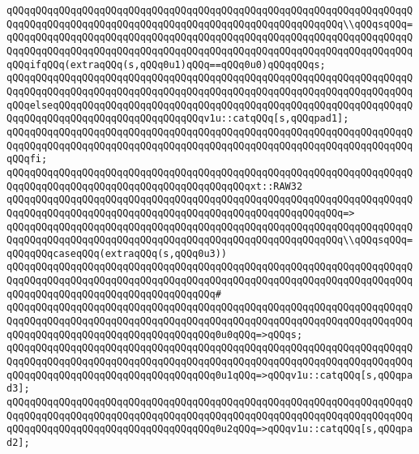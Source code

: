 \verb|qQQqqQQqqQQqqQQqqQQqqQQqqQQqqQQqqQQqqQQqqQQqqQQqqQQqqQQqqQQqqQQqqQQqqQQqqQQqqQQqqQQqqQQqqQQqqQQqqQQqqQQqqQQqqQQqqQQqqQQqqQQqqQQq\\qQQqsqQQq=|\newline
\verb|qQQqqQQqqQQqqQQqqQQqqQQqqQQqqQQqqQQqqQQqqQQqqQQqqQQqqQQqqQQqqQQqqQQqqQQqqQQqqQQqqQQqqQQqqQQqqQQqqQQqqQQqqQQqqQQqqQQqqQQqqQQqqQQqqQQqqQQqqQQqqQQqifqQQq(extraqQQq(s,qQQq0u1)qQQq==qQQq0u0)qQQqqQQqs;|\newline
\verb|qQQqqQQqqQQqqQQqqQQqqQQqqQQqqQQqqQQqqQQqqQQqqQQqqQQqqQQqqQQqqQQqqQQqqQQqqQQqqQQqqQQqqQQqqQQqqQQqqQQqqQQqqQQqqQQqqQQqqQQqqQQqqQQqqQQqqQQqqQQqqQQqelseqQQqqQQqqQQqqQQqqQQqqQQqqQQqqQQqqQQqqQQqqQQqqQQqqQQqqQQqqQQqqQQqqQQqqQQqqQQqqQQqqQQqqQQqqQQqqQQqv1u::catqQQq[s,qQQqpad1];|\newline
\verb|qQQqqQQqqQQqqQQqqQQqqQQqqQQqqQQqqQQqqQQqqQQqqQQqqQQqqQQqqQQqqQQqqQQqqQQqqQQqqQQqqQQqqQQqqQQqqQQqqQQqqQQqqQQqqQQqqQQqqQQqqQQqqQQqqQQqqQQqqQQqqQQqfi;|\newline
\newline
\verb|qQQqqQQqqQQqqQQqqQQqqQQqqQQqqQQqqQQqqQQqqQQqqQQqqQQqqQQqqQQqqQQqqQQqqQQqqQQqqQQqqQQqqQQqqQQqqQQqqQQqqQQqqQQqqQQqxt::RAW32|\newline
\verb|qQQqqQQqqQQqqQQqqQQqqQQqqQQqqQQqqQQqqQQqqQQqqQQqqQQqqQQqqQQqqQQqqQQqqQQqqQQqqQQqqQQqqQQqqQQqqQQqqQQqqQQqqQQqqQQqqQQqqQQqqQQqqQQq=>|\newline
\verb|qQQqqQQqqQQqqQQqqQQqqQQqqQQqqQQqqQQqqQQqqQQqqQQqqQQqqQQqqQQqqQQqqQQqqQQqqQQqqQQqqQQqqQQqqQQqqQQqqQQqqQQqqQQqqQQqqQQqqQQqqQQqqQQq\\qQQqsqQQq=qQQqqQQqcaseqQQq(extraqQQq(s,qQQq0u3))|\newline
\verb|qQQqqQQqqQQqqQQqqQQqqQQqqQQqqQQqqQQqqQQqqQQqqQQqqQQqqQQqqQQqqQQqqQQqqQQqqQQqqQQqqQQqqQQqqQQqqQQqqQQqqQQqqQQqqQQqqQQqqQQqqQQqqQQqqQQqqQQqqQQqqQQqqQQqqQQqqQQqqQQqqQQqqQQqqQQqqQQq#|\newline
\verb|qQQqqQQqqQQqqQQqqQQqqQQqqQQqqQQqqQQqqQQqqQQqqQQqqQQqqQQqqQQqqQQqqQQqqQQqqQQqqQQqqQQqqQQqqQQqqQQqqQQqqQQqqQQqqQQqqQQqqQQqqQQqqQQqqQQqqQQqqQQqqQQqqQQqqQQqqQQqqQQqqQQqqQQqqQQqqQQq0u0qQQq=>qQQqs;|\newline
\verb|qQQqqQQqqQQqqQQqqQQqqQQqqQQqqQQqqQQqqQQqqQQqqQQqqQQqqQQqqQQqqQQqqQQqqQQqqQQqqQQqqQQqqQQqqQQqqQQqqQQqqQQqqQQqqQQqqQQqqQQqqQQqqQQqqQQqqQQqqQQqqQQqqQQqqQQqqQQqqQQqqQQqqQQqqQQqqQQq0u1qQQq=>qQQqv1u::catqQQq[s,qQQqpad3];|\newline
\verb|qQQqqQQqqQQqqQQqqQQqqQQqqQQqqQQqqQQqqQQqqQQqqQQqqQQqqQQqqQQqqQQqqQQqqQQqqQQqqQQqqQQqqQQqqQQqqQQqqQQqqQQqqQQqqQQqqQQqqQQqqQQqqQQqqQQqqQQqqQQqqQQqqQQqqQQqqQQqqQQqqQQqqQQqqQQqqQQq0u2qQQq=>qQQqv1u::catqQQq[s,qQQqpad2];|\newline
